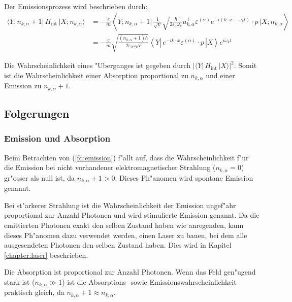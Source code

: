 Der Emissionsprozess wird beschrieben durch:
\begin{equation} \label{fq:emission}
\begin{split}
\langle Y; n_{k,\alpha} + 1 |\, H_{\text{int}} \,| X; n_{k,\alpha} \rangle &= 
-\frac{e}{m} \left\langle Y; n_{k,\alpha} + 1 \biggl| 
\, \frac{1}{\sqrt{V}} \sqrt{\frac{\hbar}{2 \varepsilon_0 \omega_k}}a^+_{k,\alpha} \varepsilon^{(\alpha)} e^{-i(k \cdot x-\omega_k t)} \cdot p \,
\biggl| X; n_{k,\alpha} \right\rangle\\
&= -\frac{e}{m} \sqrt{\frac{ (n_{k,\alpha}+1) \hbar}{2 \varepsilon_0 \omega_k V}} \left\langle Y \left| 
\, e^{-ik \cdot x} \varepsilon^{(\alpha)} \cdot p \,
\right| X \right\rangle e^{i\omega_k t}
\end{split}
\end{equation}

Die Wahrscheinlichkeit eines "Uberganges ist gegeben durch $| \langle Y| \, H_{\text{int}} \, |X \rangle |^2$.
Somit ist die Wahrscheinlichkeit einer Absorption proportional zu $n_{k,\alpha}$ und einer Emission zu $n_{k,\alpha}+1$.

\subsection{Folgerungen}
\subsubsection{Emission und Absorption}
Beim Betrachten von (\ref{fq:emission}) f"allt auf, dass die Wahrscheinlichkeit f"ur die Emission bei nicht vorhandener elektromagnetischer Strahlung ($n_{k,\alpha} = 0$) gr"osser als null ist, da $n_{k,\alpha}+1 > 0$. Dieses Ph"anomen wird spontane Emission genannt.

Bei st"arkerer Strahlung ist die Wahrscheinlichkeit der Emission ungef"ahr proportional zur Anzahl Photonen und wird stimulierte Emission genannt. Da die emittierten Photonen exakt den selben Zustand haben wie anregenden, kann dieses Ph"anomen dazu verwendet werden, einen Laser zu bauen, bei dem alle ausgesendeten Photonen den selben Zustand haben. Dies wird in Kapitel \ref{chapter:laser} beschrieben.

Die Absorption ist proportional zur Anzahl Photonen. Wenn das Feld gen"ugend stark ist ($n_{k,\alpha} \gg 1$) ist die Absorptions- sowie Emissionswahrscheinlichkeit praktisch gleich, da $n_{k,\alpha}+1 \approx n_{k,\alpha}$. 

